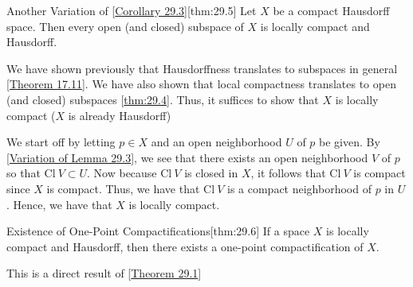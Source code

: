 \begin{thmBox}{Another Variation of [\hyperlink{cor:29.3}{Corollary 29.3}]}[thm:29.5]
    Let \( X \) be a compact Hausdorff space.
    Then every open (and closed) subspace of \( X \) is locally compact and Hausdorff.

    \baseRule

    \begin{proofBox}
        We have shown previously that Hausdorffness translates to subspaces in 
        general [\hyperlink{thm:17.11}{Theorem 17.11}].
        We have also shown that local compactness translates to open (and closed) 
        subspaces [\hyperlink{Variation of Corollary 29.3}{thm:29.4}].
        Thus, it suffices to show that \( X \) is locally compact (\( X \) is already Hausdorff)

        \baseSkip

        We start off by letting \( p \in X \) and an open neighborhood 
        \( U \) of \( p \) be given.
        By [\hyperlink{lem:29.5}{Variation of Lemma 29.3}], we see that there exists an open 
        neighborhood \( V \) of \( p \) so that \( \mathrm{Cl} \ V \subset U \).
        Now because \( \mathrm{Cl} \ V \) is closed in \( X \), it follows that
        \( \mathrm{Cl} \ V \) is compact since \( X \) is compact.
        Thus, we have that \( \mathrm{Cl} \ V \) is a compact neighborhood 
        of \( p \) in \( U \).
        Hence, we have that \( X \) is locally compact.
    \end{proofBox}
\end{thmBox}

\begin{thmBox}{Existence of One-Point Compactifications}[thm:29.6]
    If a space \( X \) is locally compact and Hausdorff, then there exists a 
    one-point compactification of \( X \).

    \baseRule

    \begin{proofBox}
        This is a direct result of [\hyperlink{thm:29.1}{Theorem 29.1}]
    \end{proofBox}
\end{thmBox}